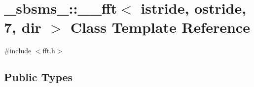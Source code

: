 \hypertarget{class__sbsms___1_1____fft_3_01istride_00_01ostride_00_017_00_01dir_01_4}{}\section{\+\_\+sbsms\+\_\+\+:\+:\+\_\+\+\_\+fft$<$ istride, ostride, 7, dir $>$ Class Template Reference}
\label{class__sbsms___1_1____fft_3_01istride_00_01ostride_00_017_00_01dir_01_4}


{\ttfamily \#include $<$fft.\+h$>$}

\subsection*{Public Types}
